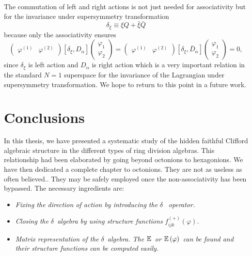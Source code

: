 \documentclass[a4paper,12pt]{book}
\begin{document}
The commutation of left and right actions is not just needed for
associativity but for the invariance under supersymmetry transformation 
\begin{equation}
\delta _{\xi }\equiv \xi Q+\bar{\xi}\bar{Q}
\end{equation}
because only the associativity ensures 
\begin{equation}
\left( 
\begin{array}{ll}
\varphi ^{\left( 1\right) } & \varphi ^{\left( 2\right) }
\end{array}
\right) \left[ \delta _{\xi },D_{\alpha }\right] \left( 
\begin{array}{l}
\varphi _{1} \\ 
\varphi _{2}
\end{array}
\right) =\left( 
\begin{array}{ll}
\varphi ^{\left( 1\right) } & \varphi ^{\left( 2\right) }
\end{array}
\right) \left[ \delta _{\xi },\bar{D}_{\dot{\alpha}}\right] \left( 
\begin{array}{l}
\varphi _{1} \\ 
\varphi _{2}
\end{array}
\right) =0,
\end{equation}
since $\delta _{\xi }$ is left action and $D_{\alpha }$ is right action
which is a very important relation in the standard $N=1$ superspace for the
invariance of the Lagrangian under supersymmetry transformation. We hope to
return to this point in a future work.

\chapter{Conclusions}


In this thesis, we have presented a systematic study of the hidden faithful
Clifford algebraic structure in the different types of ring division
algebras. This relationship had been elaborated by going beyond octonions to
hexagonions. We have then dedicated a complete chapter to octonions. They
are not as useless as often believed.. They may be safely employed once the
non-associativity has been bypassed. The necessary ingredients are:

\begin{itemize}
\item  \emph{Fixing the direction of action by introducing the }$\delta $%
\emph{\ operator.}

\item  \emph{Closing the }$\delta $\emph{\ algebra by using structure
functions }$f_{ijk}^{\left( +\right) }\left( \varphi \right) $\emph{.}

\item  \emph{Matrix representation of the }$\delta $\emph{\ algebra. The }$%
\Bbb{E}$\emph{\ or }$\Bbb{E}\left( \varphi \right) $\emph{\ can be found and
their structure functions can be computed easily.}
\end{itemize}
\end{document}
